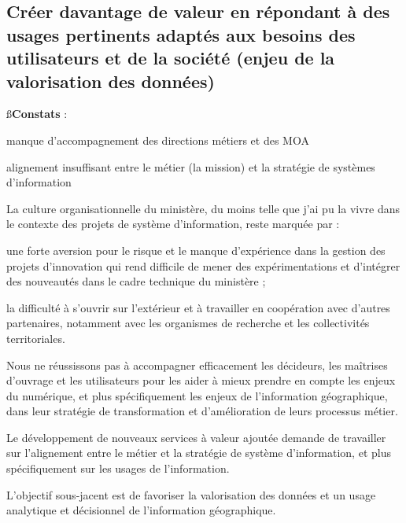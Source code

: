 \subsection
{Créer davantage de valeur en répondant à des usages pertinents adaptés aux
besoins des utilisateurs et de la société (enjeu de la valorisation des
données)}

{\ss\bf Constats} :

\startitemize

\item manque d'accompagnement des directions métiers et des MOA

\item alignement insuffisant entre le métier (la mission) et la stratégie de
systèmes d'information

\stopitemize

La culture organisationnelle du ministère, du moins telle que j'ai pu la vivre
dans le contexte des projets de système d'information, reste marquée par :

une forte aversion pour le risque et le manque d'expérience dans la gestion
des projets d'innovation qui rend difficile de mener des expérimentations et
d'intégrer des nouveautés dans le cadre technique du ministère ;

la difficulté à s'ouvrir sur l'extérieur et à travailler en coopération avec
d'autres partenaires, notamment avec les organismes de recherche et les
collectivités territoriales.

Nous ne réussissons pas à accompagner efficacement les décideurs, les
maîtrises d'ouvrage et les utilisateurs pour les aider à mieux prendre en
compte les enjeux du numérique, et plus spécifiquement les enjeux de
l'information géographique, dans leur stratégie de transformation et
d'amélioration de leurs processus métier.

Le développement de nouveaux services à valeur ajoutée demande de travailler
sur l'alignement entre le métier et la stratégie de système d'information, et
plus spécifiquement sur les usages de l'information.

L'objectif sous-jacent est de favoriser la valorisation des données et un
usage analytique et décisionnel de l'information géographique.
